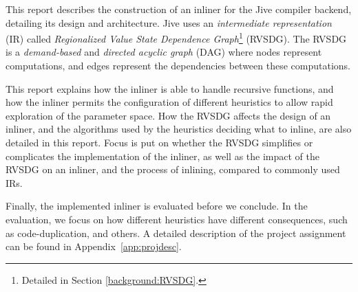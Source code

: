 This report describes the construction of an inliner for the Jive compiler
backend, detailing its design and architecture. Jive uses an
\textit{intermediate representation} (IR) called \textit{Regionalized Value
State Dependence Graph}\footnote{Detailed in Section \ref{background:RVSDG}.}
(RVSDG). The RVSDG\cite{RVSDG:HiPEACpaper} is a \textit{demand-based} and
\textit{directed acyclic graph} (DAG) where nodes represent computations, and
edges represent the dependencies between these computations.


This report explains how the inliner is able to handle recursive functions, and
how the inliner permits the configuration of different heuristics to allow rapid
exploration of the parameter space. How the RVSDG affects the design of an
inliner, and the algorithms used by the heuristics deciding what to inline, are
also detailed in this report. Focus is put on whether the RVSDG simplifies or
complicates the implementation of the inliner, as well as the impact of the
RVSDG on an inliner, and the process of inlining, compared to commonly used IRs.

Finally, the implemented inliner is evaluated before we conclude. In the
evaluation, we focus on how different heuristics have different consequences,
such as code-duplication, and others. A detailed description of the project
assignment can be found in Appendix~\ref{app:projdesc}.
